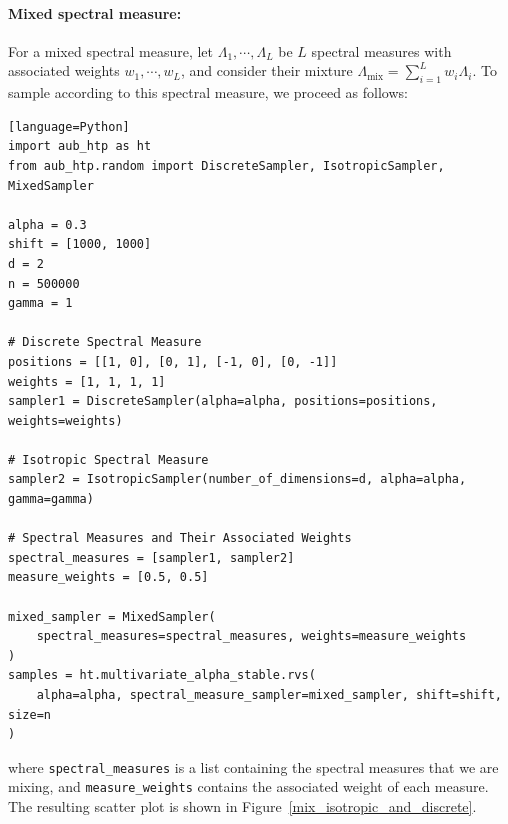 \paragraph{Mixed spectral measure:} For a mixed spectral measure, let $\Lambda_1, \cdots, \Lambda_L$ be $L$ spectral measures with associated weights $w_1, \cdots, w_L$, and consider their mixture $\Lambda_{\text{mix}} = \sum_{i=1}^L w_i \Lambda_i$. To sample according to this spectral measure, we proceed as follows:

\begin{verbatim}[language=Python]
import aub_htp as ht
from aub_htp.random import DiscreteSampler, IsotropicSampler, MixedSampler

alpha = 0.3
shift = [1000, 1000]
d = 2
n = 500000
gamma = 1

# Discrete Spectral Measure
positions = [[1, 0], [0, 1], [-1, 0], [0, -1]]
weights = [1, 1, 1, 1]
sampler1 = DiscreteSampler(alpha=alpha, positions=positions, weights=weights)

# Isotropic Spectral Measure
sampler2 = IsotropicSampler(number_of_dimensions=d, alpha=alpha, gamma=gamma)

# Spectral Measures and Their Associated Weights
spectral_measures = [sampler1, sampler2]
measure_weights = [0.5, 0.5]

mixed_sampler = MixedSampler(
    spectral_measures=spectral_measures, weights=measure_weights
)
samples = ht.multivariate_alpha_stable.rvs(
    alpha=alpha, spectral_measure_sampler=mixed_sampler, shift=shift, size=n
)

\end{verbatim}
where \texttt{spectral\_measures} is a list containing the spectral measures that we are mixing, and \texttt{measure\_weights} contains the associated weight of each measure. The resulting scatter plot is shown in Figure~\ref{mix_isotropic_and_discrete}.

